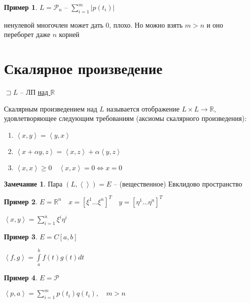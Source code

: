 \documentclass{book}
\newcommand\R{\ensuremath{\mathbb{R}}}
\theoremstyle{definition}
\newtheorem*{note}{Замечание}
\newtheorem*{example}{Пример}
\begin{document}
\begin{example}
    $L = \mathscr{P}_n$ -- $\sum_{i=1}^{m} |p(t_i)|$

    ненулевой многочлен может дать 0, плохо. Но можно взять $m>n$ и оно переборет даже  $n$ корней
\end{example}

\section{Скалярное произведение}

\begin{definition}
    $\sqsupset L$ -- ЛП \underline{над $\R$}
    
    Скалярным произведением над $L$ называется отображение $L\times L \to \R$, удовлетворяющее следующим требованиям (аксиомы скалярного произведения):
     \begin{enumerate}
            \item $\left<x, y \right> = \left<y, x \right>$
            \item $\left<x + \alpha y, z \right> = \left<x,z \right> + \alpha\left<y,z \right>$
            \item $\left<x, x \right> \geqslant 0\quad \left<x,x \right> = 0 \iff  x  = 0$
     \end{enumerate}
\end{definition}

\begin{note}
    Пара $\left( L, \left< \right> \right) = E $ -- (вещественное) Евклидово пространство 
\end{note}

\begin{example}
    $E = \R^n\quad x = \left[ \xi^1 \ldots \xi^n \right] ^T \quad y = \left[ \eta^1 \ldots \eta^n \right] ^T$

    $\left<x, y \right> = \sum_{i=1}^{n} \xi^i\eta^i$
\end{example}

\begin{example}
    $E = C[a,b]$

    $\left<f, g \right> = \int\limits_a^bf(t)g(t)dt$
\end{example}

\begin{example}
    $E = \mathscr{P}$

    $\left<p, a \right> = \sum_{i=1}^{m} p(t_i)q(t_i),\quad m>n$
\end{example}
\end{document}
